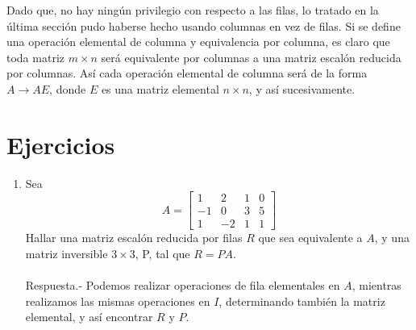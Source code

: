 Dado que, no hay ningún privilegio con respecto a las filas, lo tratado en la última sección pudo haberse hecho usando columnas en vez de filas. Si se define una operación elemental de columna y equivalencia por columna, es claro que toda matriz $m\times n$ será equivalente por columnas a una matriz escalón reducida por columnas. Así cada operación elemental de columna será de la forma $A\to AE$, donde $E$ es una matriz elemental $n\times n$, y así sucesivamente.


\section*{Ejercicios}

\begin{enumerate}[\bfseries 1.]

    \item Sea
    $$
    A = 
	\left[
	    \begin{array}{*{4}{r}}
		1 & 2 & 1 & 0 \\
		-1 & 0 & 3 & 5 \\
		1 & -2 & 1 & 1
	    \end{array}
	\right]
    $$
    Hallar una matriz escalón reducida por filas $R$ que sea equivalente a $A$, y una matriz inversible $3\times 3$, P, tal que $R=PA.$\\\\
	Respuesta.-\; Podemos realizar operaciones de fila elementales en $A$, mientras realizamos las mismas operaciones en $I$, determinando también la matriz elemental, y así encontrar $R$ y $P$.


\end{enumerate}
